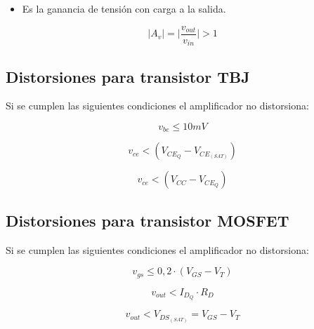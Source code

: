 \begin{itemize}
    \item Es la ganancia de tensión con carga a la salida.
\end{itemize}
\begin{equation}
    |A_{v}| = \bigg|\frac{v_{out}}{v_{in}}\bigg| > 1 
\end{equation}





\subsection{Distorsiones para transistor TBJ}

Si se cumplen las siguientes condiciones el amplificador no distorsiona:

\begin{equation}
    v_{be} \leq 10mV
\end{equation}

\begin{equation}
    v_{ce} < (V_{CE_Q} - V_{CE_{(SAT)}})
\end{equation}

\begin{equation}
    v_{ce} < (V_{CC} - V_{CE_Q})
\end{equation}

\subsection{Distorsiones para transistor MOSFET}

Si se cumplen las siguientes condiciones el amplificador no distorsiona:

\begin{equation}
   v_{gs} \leq 0,2\cdot(V_{GS} - V_T)
\end{equation}

\begin{equation}
    v_{out} < I_{D_Q}\cdot R_D
\end{equation}

\begin{equation}
    v_{out} < V_{DS_{(SAT)}} = V_{GS} - V_T
\end{equation}





